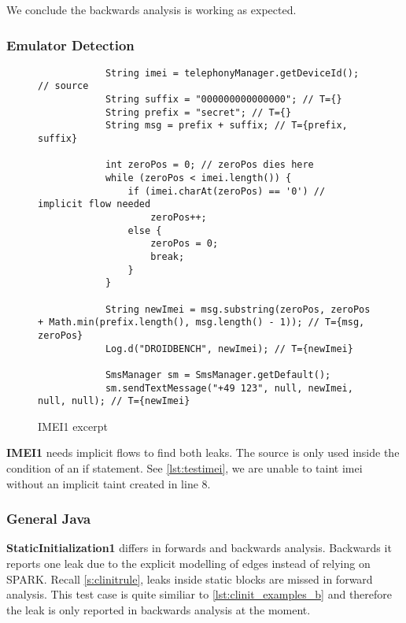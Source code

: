 \documentclass[../draft.tex]{subfiles}
\begin{document}
    We conclude the backwards analysis is working as expected.

    \subsubsection{Emulator Detection}
    \begin{figure}
        \begin{lstlisting}
            String imei = telephonyManager.getDeviceId(); // source
            String suffix = "000000000000000"; // T={}
            String prefix = "secret"; // T={}
            String msg = prefix + suffix; // T={prefix, suffix}

            int zeroPos = 0; // zeroPos dies here
            while (zeroPos < imei.length()) {
                if (imei.charAt(zeroPos) == '0') // implicit flow needed
                    zeroPos++;
                else {
                    zeroPos = 0;
                    break;
                }
            }
            
            String newImei = msg.substring(zeroPos, zeroPos + Math.min(prefix.length(), msg.length() - 1)); // T={msg, zeroPos}
            Log.d("DROIDBENCH", newImei); // T={newImei}
    
            SmsManager sm = SmsManager.getDefault();
            sm.sendTextMessage("+49 123", null, newImei, null, null); // T={newImei}
        \end{lstlisting}
        \caption{IMEI1 excerpt}
        \label{lst:testimei}
    \end{figure}

    \textbf{IMEI1} needs implicit flows to find both leaks. The source is only used inside the condition of an if statement. See \autoref{lst:testimei}, we are unable to taint imei without an implicit taint created in line 8. 

    \subsubsection{General Java}
    \textbf{StaticInitialization1} differs in forwards and backwards analysis. Backwards it reports one leak due to the explicit modelling of  edges instead of relying on SPARK. Recall \autoref{s:clinitrule}, leaks inside static blocks are missed in forward analysis. This test case is quite similiar to \autoref{lst:clinit_examples_b} and therefore the leak is only reported in backwards analysis at the moment.
    
\end{document}
